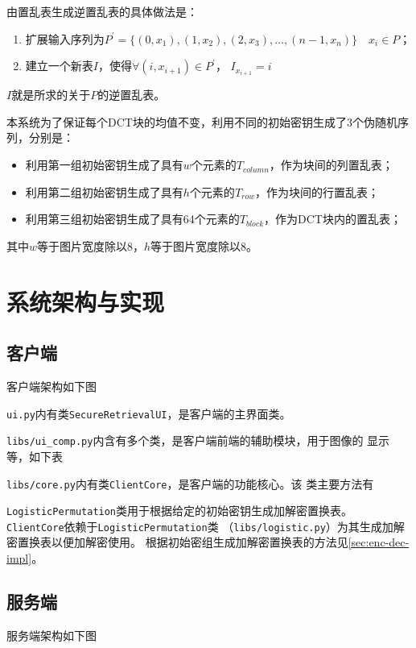 由置乱表生成逆置乱表的具体做法是：
\begin{enumerate}
  \item 扩展输入序列为$P^\prime = \{(0, x_1), (1, x_2), (2, x_3),
      \dotsc, (n - 1, x_n)\} \quad x_i \in P$；
  \item 建立一个新表$I$，使得$\forall (i, x_{i + 1}) \in P^\prime$，
      $I_{x_{i + 1}} = i$
\end{enumerate}
$I$就是所求的关于$P$的逆置乱表。

本系统为了保证每个DCT块的均值不变，利用不同的初始密钥生成了3个伪随机序列，分别是：
\begin{itemize}
  \item 利用第一组初始密钥生成了具有$w$个元素的$T_{column}$，作为块间的列置乱表；
  \item 利用第二组初始密钥生成了具有$h$个元素的$T_{row}$，作为块间的行置乱表；
  \item 利用第三组初始密钥生成了具有64个元素的$T_{block}$，作为DCT块内的置乱表；
\end{itemize}
其中$w$等于图片宽度除以$8$，$h$等于图片宽度除以$8$。

\section{系统架构与实现}
\label{sec:sys-arch}
\subsection{客户端}
客户端架构如下图


\texttt{ui.py}内有类\texttt{SecureRetrievalUI}，是客户端的主界面类。

\texttt{libs/ui\_comp.py}内含有多个类，是客户端前端的辅助模块，用于图像的
显示等，如下表


\texttt{libs/core.py}内有类\texttt{ClientCore}，是客户端的功能核心。该
类主要方法有


\texttt{LogisticPermutation}类用于根据给定的初始密钥生成加解密置换表。
\texttt{ClientCore}依赖于\texttt{LogisticPermutation}类
（\texttt{libs/logistic.py}）为其生成加解密置换表以便加解密使用。
根据初始密组生成加解密置换表的方法见\ref{sec:enc-dec-impl}。

\subsection{服务端}
服务端架构如下图


